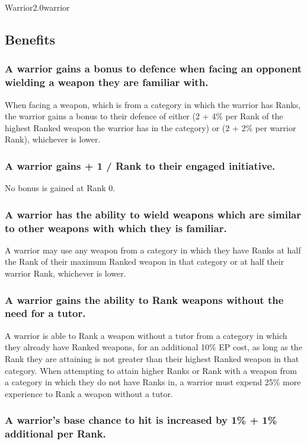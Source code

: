 \begin{skill*}{Warrior}{2.0}{warrior}
\subsection{Benefits}

\subsubsection{A warrior gains a bonus to defence when facing an
opponent wielding a weapon they are familiar with.}

When facing a weapon, which is from a category in which the warrior
has Ranks, the warrior gains a bonus to their defence of either (2 +
4\% per Rank of the highest Ranked weapon the warrior has in the
category) or (2 + 2\% per warrior Rank), whichever is lower.

\subsubsection{A warrior gains + 1 / Rank to their engaged initiative.}

No bonus is gained at Rank 0.

\subsubsection{A warrior has the ability to wield weapons which are
similar to other weapons with which they is familiar.}

A warrior may use any weapon from a category in which they have Ranks
at half the Rank of their maximum Ranked weapon in that category or at
half their warrior Rank, whichever is lower.

\subsubsection{A warrior gains the ability to Rank weapons without the
need for a tutor.}

A warrior is able to Rank a weapon without a tutor from a category in
which they already have Ranked weapons, for an additional 10\% EP
cost, as long as the Rank they are attaining is not greater than their
highest Ranked weapon in that category.  When attempting to attain
higher Ranks or Rank with a weapon from a category in which they do
not have Ranks in, a warrior must expend 25\% more experience to Rank
a weapon without a tutor.

\subsubsection{A warrior's base chance to hit is increased by 1\% + 1\%
additional per Rank.}


\end{skill*}
